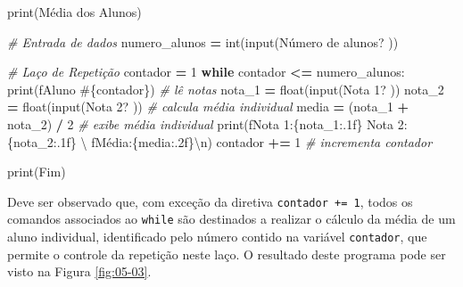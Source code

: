 \documentclass[
]{book}
\newenvironment{Shaded}{\begin{snugshade}}{\end{snugshade}}
\newcommand{\BuiltInTok}[1]{#1}
\newcommand{\CharTok}[1]{\textcolor[rgb]{0.31,0.60,0.02}{#1}}
\newcommand{\CommentTok}[1]{\textcolor[rgb]{0.56,0.35,0.01}{\textit{#1}}}
\newcommand{\ControlFlowTok}[1]{\textcolor[rgb]{0.13,0.29,0.53}{\textbf{#1}}}
\newcommand{\DecValTok}[1]{\textcolor[rgb]{0.00,0.00,0.81}{#1}}
\newcommand{\NormalTok}[1]{#1}
\newcommand{\OperatorTok}[1]{\textcolor[rgb]{0.81,0.36,0.00}{\textbf{#1}}}
\newcommand{\SpecialCharTok}[1]{\textcolor[rgb]{0.00,0.00,0.00}{#1}}
\newcommand{\SpecialStringTok}[1]{\textcolor[rgb]{0.31,0.60,0.02}{#1}}
\newcommand{\StringTok}[1]{\textcolor[rgb]{0.31,0.60,0.02}{#1}}
\begin{document}
\begin{Shaded}
\begin{Highlighting}[]
\BuiltInTok{print}\NormalTok{(}\StringTok{\textquotesingle{}Média dos Alunos\textquotesingle{}}\NormalTok{)}

\CommentTok{\# Entrada de dados}
\NormalTok{numero\_alunos }\OperatorTok{=} \BuiltInTok{int}\NormalTok{(}\BuiltInTok{input}\NormalTok{(}\StringTok{\textquotesingle{}Número de alunos? \textquotesingle{}}\NormalTok{))}

\CommentTok{\# Laço de Repetição}
\NormalTok{contador }\OperatorTok{=} \DecValTok{1}
\ControlFlowTok{while}\NormalTok{ contador }\OperatorTok{\textless{}=}\NormalTok{ numero\_alunos:}
    \BuiltInTok{print}\NormalTok{(}\SpecialStringTok{f\textquotesingle{}Aluno \#}\SpecialCharTok{\{}\NormalTok{contador}\SpecialCharTok{\}}\SpecialStringTok{\textquotesingle{}}\NormalTok{)}
    \CommentTok{\# lê notas}
\NormalTok{    nota\_1 }\OperatorTok{=} \BuiltInTok{float}\NormalTok{(}\BuiltInTok{input}\NormalTok{(}\StringTok{\textquotesingle{}Nota 1? \textquotesingle{}}\NormalTok{))}
\NormalTok{    nota\_2 }\OperatorTok{=} \BuiltInTok{float}\NormalTok{(}\BuiltInTok{input}\NormalTok{(}\StringTok{\textquotesingle{}Nota 2? \textquotesingle{}}\NormalTok{))}
    \CommentTok{\# calcula média individual}
\NormalTok{    media }\OperatorTok{=}\NormalTok{ (nota\_1 }\OperatorTok{+}\NormalTok{ nota\_2) }\OperatorTok{/} \DecValTok{2}
    \CommentTok{\# exibe média individual}
    \BuiltInTok{print}\NormalTok{(}\SpecialStringTok{f\textquotesingle{}Nota 1:}\SpecialCharTok{\{}\NormalTok{nota\_1}\SpecialCharTok{:.1f\}}\SpecialStringTok{  Nota 2:}\SpecialCharTok{\{}\NormalTok{nota\_2}\SpecialCharTok{:.1f\}}\SpecialStringTok{  \textquotesingle{}}\NormalTok{ \textbackslash{}}
        \SpecialStringTok{f\textquotesingle{}Média:}\SpecialCharTok{\{}\NormalTok{media}\SpecialCharTok{:.2f\}}\CharTok{\textbackslash{}n}\SpecialStringTok{\textquotesingle{}}\NormalTok{)}
\NormalTok{    contador }\OperatorTok{+=} \DecValTok{1} \CommentTok{\# incrementa contador}

\BuiltInTok{print}\NormalTok{(}\StringTok{\textquotesingle{}Fim\textquotesingle{}}\NormalTok{)}
\end{Highlighting}
\end{Shaded}

Deve ser observado que, com exceção da diretiva \texttt{contador\ +=\ 1}, todos os comandos associados ao \texttt{while} são destinados a realizar o cálculo da média de um aluno individual, identificado pelo número contido na variável \texttt{contador}, que permite o controle da repetição neste laço. O resultado deste programa pode ser visto na Figura \ref{fig:05-03}.
\end{document}
